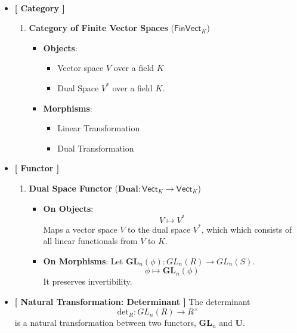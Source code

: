 \begin{example}
\begin{figure}[h!]
\end{figure}
\end{example}
\newpage
\begin{example}
\ \begin{itemize}
	\item[] \textbf{[ Category ]}
	\begin{enumerate}
		\item \textbf{Category of Finite Vector Spaces} ($\mathsf{FinVect}_K$)
		\begin{itemize}
			\item \textbf{Objects}: 
			\begin{itemize}
				\item Vector space $V$ over a field $K$
				\item Dual Space $V^*$ over a field $K$.
			\end{itemize}
			\item \textbf{Morphisms}:  
			\begin{itemize}
				\item Linear Transformation
				\item Dual Transformation
			\end{itemize}
		\end{itemize}
	\end{enumerate}
	\item[] \textbf{[ Functor ]}
	\begin{enumerate}
		\item \textbf{Dual Space Functor} ($\mathbf{Dual}:\mathsf{Vect}_K\to\mathsf{Vect}_K$)
		\begin{itemize}
			\item \textbf{On Objects}: \[
			V\mapsto V^*
			\] Maps a vector space $V$ to the dual space $V^*$, which  which consists of all linear functionals from $V$ to $K$.
			\item \textbf{On Morphisms}: Let $\mathbf{GL}_n(\phi):GL_n(R)\to GL_n(S)$. \[
			\phi\mapsto\mathbf{GL}_n(\phi)
			\] It preserves invertibility.
		\end{itemize}
	\end{enumerate}
	\item \textbf{[ Natural Transformation: Determinant ]} The determinant \[
	\text{det}_R:GL_n(R)\to R^{\times}
	\] is a natural transformation between two functors, $\mathbf{GL}_n$ and $\mathbf{U}$.
\end{itemize}
\end{example}


